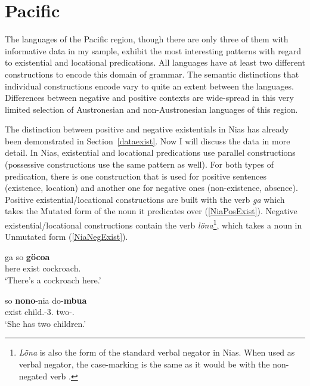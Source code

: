 \section{Pacific}\label{ExistOc}

The languages of the Pacific region, though there are only three of them with informative data in my sample, exhibit the most interesting patterns with regard to existential and locational predications.
All languages have at least two different constructions to encode this domain of grammar. 
The semantic distinctions that individual constructions encode vary to quite an extent between the languages. 
Differences between negative and positive contexts are wide-spread in this very limited selection of Austronesian and non-Austronesian languages of this region. 

The distinction between positive and negative existentials in Nias has already been demonstrated in Section~\ref{dataexist}.
Now I will discuss the data in more detail.
In Nias, existential and locational predications use parallel constructions (possessive constructions use the same pattern as well).
For both types of predication, there is one construction that is used for positive sentences (existence, location) and another one for negative ones (non-existence, absence).
Positive existential/locational constructions are built with the verb \emph{ga} which takes the Mutated form of the noun it predicates over (\ref{NiaPosExist}).  
Negative existential/locational constructions contain the verb \emph{l\"ona}\footnote{\textit{Löna} is also the form of the standard verbal negator in Nias.  
When used as verbal negator, the case-marking is the same as it would be with the non-negated verb \citep[471--475]{Brown:2001}.}, which takes a noun in Unmutated form (\ref{NiaNegExist}).

\begin{exe} \ex\label{NiaPosExist}
\begin{xlist} \ex \gll ga so \textbf{g\"ocoa}\\
here exist cockroach.\mut{}\\
\glt `There's a cockroach here.'

\ex \gll so \textbf{nono}-nia do-\textbf{mbua}\\
exist child.\mut{}-3\sg{}.\poss{} two-\clf{}.\mut{}\\
\glt `She has two children.'
\end{xlist}
\end{exe}

